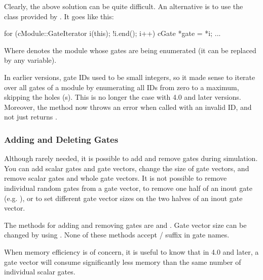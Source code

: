 Clearly, the above solution can be quite difficult. An alternative is to use
the  class provided by .
It goes like this:

\begin{cpp}
for (cModule::GateIterator i(this); !i.end(); i++) {
    cGate *gate = *i;
    ...
}
\end{cpp}

Where  denotes the module whose gates are being enumerated
(it can be replaced by any  variable).

\begin{note}
    In earlier {\opp} versions, gate IDs used to be small integers, so
    it made sense to iterate over all gates of a module by enumerating
    all IDs from zero to a maximum, skipping the holes (s).
    This is no longer the case with {\opp} 4.0 and later versions.
    Moreover, the  method now throws an error when called
    with an invalid ID, and not just returns .
\end{note}


\subsubsection{Adding and Deleting Gates}
\label{sec:simple-modules:adding-and-deleting-gates}

Although rarely needed, it is possible to add and remove gates during
simulation. You can add scalar gates and gate vectors, change the size of
gate vectors, and remove scalar gates and whole gate vectors.
It is not possible to remove individual random gates from a gate vector,
to remove one half of an inout gate (e.g. ), or to set
different gate vector sizes on the two halves of an inout gate vector.

The  methods for adding and removing gates are
 and .
Gate vector size can be changed by using .
None of these methods accept  /  suffix in gate names.

\begin{note}
    When memory efficiency is of concern, it is useful to know that
    in {\opp} 4.0 and later, a gate vector will consume significantly less
    memory than the same number of individual scalar gates.
\end{note}


